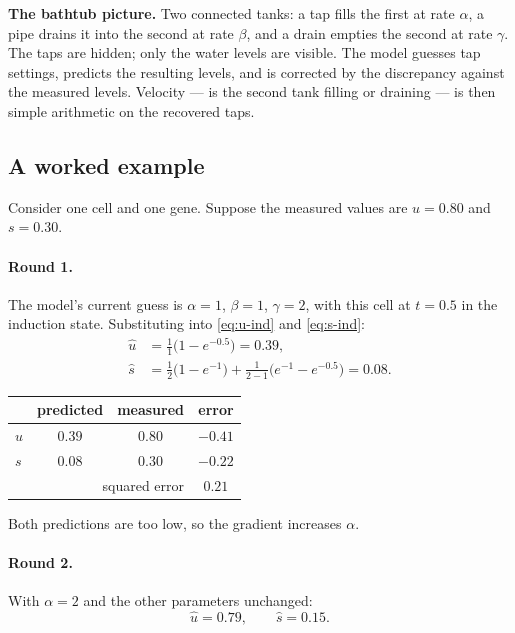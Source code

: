\documentclass[11pt,a4paper]{article}
\newenvironment{keybox}{\begin{shaded}\noindent}{\end{shaded}}
\newcommand{\uns}{u}
\newcommand{\spl}{s}
\theoremstyle{definition}
\begin{document}
\begin{keybox}
\textbf{The bathtub picture.} Two connected tanks: a tap fills the first at
rate $\alpha$, a pipe drains it into the second at rate $\beta$, and a drain
empties the second at rate $\gamma$. The taps are hidden; only the water levels
are visible. The model guesses tap settings, predicts the resulting levels, and
is corrected by the discrepancy against the measured levels. Velocity --- is
the second tank filling or draining --- is then simple arithmetic on the
recovered taps.
\end{keybox}

\subsection{A worked example}

Consider one cell and one gene. Suppose the measured values are
$\uns = 0.80$ and $\spl = 0.30$.

\paragraph{Round 1.} The model's current guess is $\alpha = 1$, $\beta = 1$,
$\gamma = 2$, with this cell at $t = 0.5$ in the induction state. Substituting
into \eqref{eq:u-ind} and \eqref{eq:s-ind}:
%
\begin{align}
\hat{\uns} &= \tfrac{1}{1}\big(1 - e^{-0.5}\big) = 0.39, \\
\hat{\spl} &= \tfrac{1}{2}\big(1 - e^{-1}\big) + \tfrac{1}{2-1}\big(e^{-1} - e^{-0.5}\big) = 0.08.
\end{align}

\begin{center}
\begin{tabular}{@{}lccc@{}}
\toprule
 & predicted & measured & error \\
\midrule
$\uns$ & $0.39$ & $0.80$ & $-0.41$ \\
$\spl$ & $0.08$ & $0.30$ & $-0.22$ \\
\midrule
\multicolumn{3}{r}{squared error} & $\mathbf{0.21}$ \\
\bottomrule
\end{tabular}
\end{center}

Both predictions are too low, so the gradient increases $\alpha$.

\paragraph{Round 2.} With $\alpha = 2$ and the other parameters unchanged:
%
\begin{equation}
\hat{\uns} = 0.79, \qquad \hat{\spl} = 0.15.
\end{equation}
\end{document}
